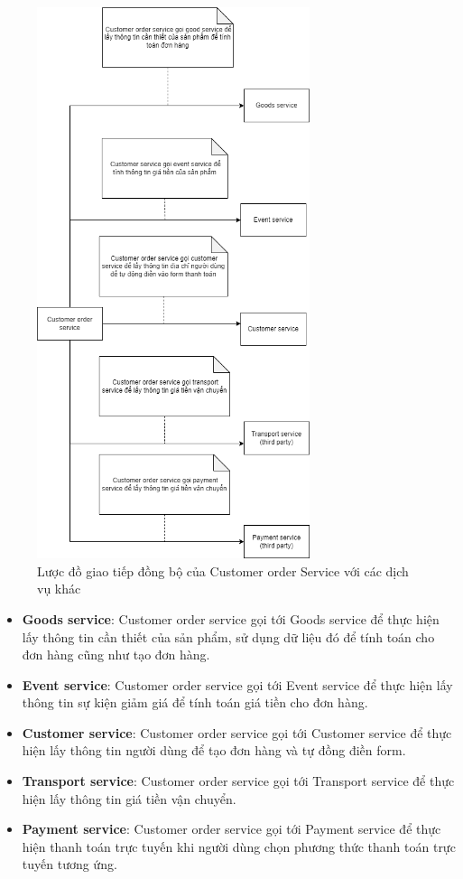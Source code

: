\begin{figure}[!htp]
	\centering
	\includegraphics[width=8cm]{img/Architecture/service/customer-order-call.png}
	\newline
	\caption{Lược đồ giao tiếp đồng bộ của Customer order Service với các dịch vụ khác}
\end{figure}

\begin{itemize}
	\item \textbf{Goods service}: Customer order service gọi tới Goods service để thực hiện lấy thông tin cần thiết của sản phẩm, sử dụng dữ liệu đó để tính toán cho đơn hàng cũng như tạo đơn hàng.
	\item \textbf{Event service}: Customer order service gọi tới Event service để thực hiện lấy thông tin sự kiện giảm giá để tính toán giá tiền cho đơn hàng.
	\item \textbf{Customer service}: Customer order service gọi tới Customer service để thực hiện lấy thông tin người dùng để tạo đơn hàng và tự đồng điền form.
	\item \textbf{Transport service}: Customer order service gọi tới Transport service để thực hiện lấy thông tin giá tiền vận chuyển.
	\item \textbf{Payment service}: Customer order service gọi tới Payment service để thực hiện thanh toán trực tuyến khi người dùng chọn phương thức thanh toán trực tuyến tương ứng.
\end{itemize}


